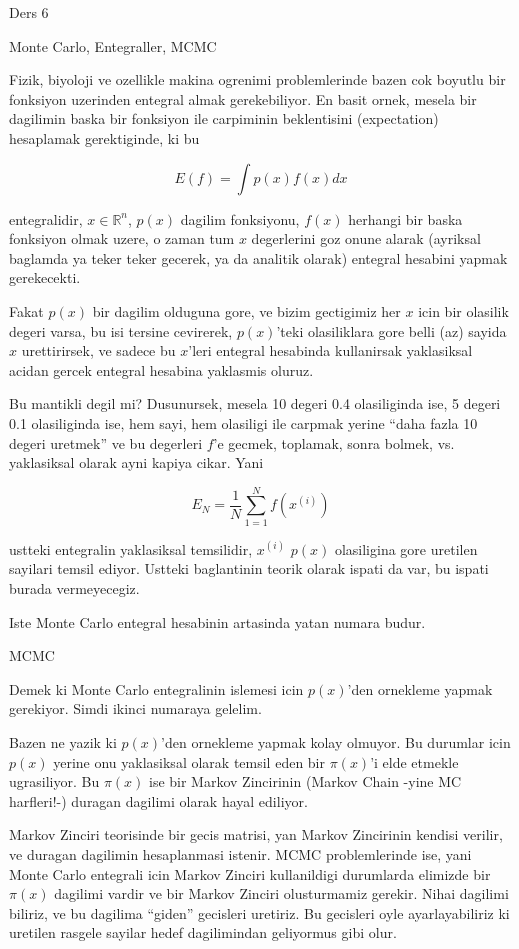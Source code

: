 \documentclass[12pt,fleqn]{article}\usepackage{../common}
\begin{document}
Ders 6

Monte Carlo, Entegraller, MCMC

Fizik, biyoloji ve ozellikle makina ogrenimi problemlerinde bazen cok
boyutlu bir fonksiyon uzerinden entegral almak gerekebiliyor. En basit
ornek, mesela bir dagilimin baska bir fonksiyon ile carpiminin beklentisini
(expectation) hesaplamak gerektiginde, ki bu

\[ E(f) = \int p(x)f(x)dx \]

entegralidir, $x \in \mathbb{R}^n$, $p(x)$ dagilim fonksiyonu, $f(x)$ herhangi bir
baska fonksiyon olmak uzere, o zaman tum $x$ degerlerini goz onune alarak
(ayriksal baglamda ya teker teker gecerek, ya da analitik olarak) entegral
hesabini yapmak gerekecekti.

Fakat $p(x)$ bir dagilim olduguna gore, ve bizim gectigimiz her $x$ icin
bir olasilik degeri varsa, bu isi tersine cevirerek, $p(x)$'teki
olasiliklara gore belli (az) sayida $x$ urettirirsek, ve sadece bu $x$'leri
entegral hesabinda kullanirsak yaklasiksal acidan gercek entegral hesabina
yaklasmis oluruz. 

Bu mantikli degil mi? Dusunursek, mesela 10 degeri 0.4 olasiliginda ise, 5
degeri 0.1 olasiliginda ise, hem sayi, hem olasiligi ile carpmak yerine
``daha fazla 10 degeri uretmek'' ve bu degerleri $f$'e gecmek, toplamak,
sonra bolmek, vs. yaklasiksal olarak ayni kapiya cikar. Yani

\[ E_N = \frac{1}{N}\sum_{1=1}^N f(x^{(i)}) \]

ustteki entegralin yaklasiksal temsilidir, $x^{(i)}$ $p(x)$ olasiligina
gore uretilen sayilari temsil ediyor. Ustteki baglantinin teorik olarak
ispati da var, bu ispati burada vermeyecegiz. 

Iste Monte Carlo entegral hesabinin artasinda yatan numara budur. 

MCMC

Demek ki Monte Carlo entegralinin islemesi icin $p(x)$'den ornekleme yapmak
gerekiyor. Simdi ikinci numaraya gelelim. 

Bazen ne yazik ki $p(x)$'den ornekleme yapmak kolay olmuyor. Bu durumlar
icin $p(x)$ yerine onu yaklasiksal olarak temsil eden bir $\pi(x)$'i elde
etmekle ugrasiliyor. Bu $\pi(x)$ ise bir Markov Zincirinin (Markov Chain
-yine MC harfleri!-) duragan dagilimi olarak hayal ediliyor. 

Markov Zinciri teorisinde bir gecis matrisi, yan Markov Zincirinin kendisi
verilir, ve duragan dagilimin hesaplanmasi istenir. MCMC problemlerinde
ise, yani Monte Carlo entegrali icin Markov Zinciri kullanildigi durumlarda
elimizde bir $\pi(x)$ dagilimi vardir ve bir Markov Zinciri olusturmamiz
gerekir. Nihai dagilimi biliriz, ve bu dagilima ``giden'' gecisleri
uretiriz. Bu gecisleri oyle ayarlayabiliriz ki uretilen rasgele sayilar
hedef dagilimindan geliyormus gibi olur. 
\end{document}
